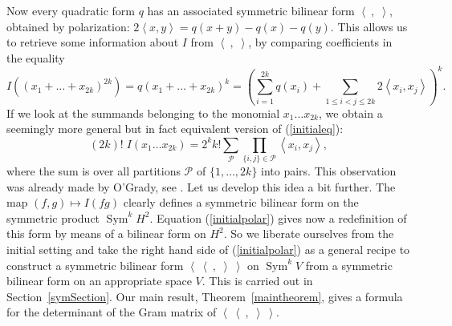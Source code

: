 \documentclass{amsart}
\DeclareMathOperator{\Sym}{Sym}
\newcommand{\bra}{\left<\!\!\!\:\left<}
\newcommand{\ket}{\right>\!\!\!\:\right>}
\theoremstyle{plain}
\theoremstyle{definition}
\theoremstyle{remark}
\begin{document}
Now every quadratic form $q$ has an associated symmetric bilinear form $\left<\ ,\;\right>$, obtained by polarization: $2\left<x,y\right> = q(x+y)-q(x)-q(y)$. This allows us to retrieve some information about $I$ from $\left<\ ,\;\right>$,
by comparing coefficients in the equality
\begin{equation*}
I\!\left((x_1+\ldots+x_{2k})^{2k}\right) = q(x_1+\ldots+x_{2k})^{k} = \left(\sum\limits_{i=1}^{2k} q(x_i) +\!\!\!\sum\limits_{1\leq i<j\leq 2k}\!\!2 \left<x_i,x_j\right>  \right)^k.
\end{equation*}
If we look at the summands belonging to the monomial $x_1\ldots x_{2k}$, we obtain a seemingly more general but in fact equivalent version of (\ref{initialeq}):
\begin{equation} \label{initialpolar}
 (2k)!\; I\!\left(x_1\ldots x_{2k}\right) = 2^k k!\sum_{\mathcal{P}} \prod_{\{i,j\}\in\mathcal{P}}\left<x_i,x_j\right>,
\end{equation}
where the sum is over all partitions $\mathcal{P}$ of $\{1,\ldots,2k\}$ into pairs. This observation was already made by O'Grady, see \cite[Eq.~3.2.4]{OGrady}. Let us develop this idea a bit further. The map $(f,g) \mapsto I(fg)$ clearly defines a symmetric bilinear form on the symmetric product $\Sym^kH^2$.
Equation (\ref{initialpolar}) gives now a redefinition of this form by means of a bilinear form on $H^2$. So we liberate ourselves from the initial setting and take the right hand side of (\ref{initialpolar}) as a general recipe to construct a symmetric bilinear form $\bra\ ,\;\ket$ on $\Sym^kV$ from a symmetric bilinear form on an appropriate space $V$. This is carried out in Section~\ref{symSection}. Our main result, Theorem~\ref{maintheorem}, gives a formula for the determinant of the Gram matrix of $\bra\ ,\;\ket$. 
\end{document}
